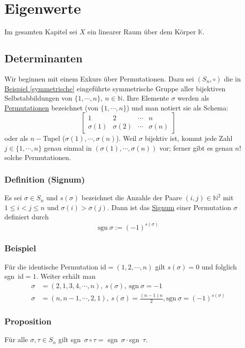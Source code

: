 \section{Eigenwerte}
Im gesamten Kapitel sei $X$ ein linearer Raum über dem Körper $\mathbb{K}$.
\subsection{Determinanten}
Wir beginnen mit einem Exkurs über Permutationen.  Dazu sei $(S_n,\circ )$ die in \hyperref[symmetrische]{Beispiel \ref*{symmetrische}} eingeführte symmetrische Gruppe aller bijektiven Selbstabbildungen von $\{1,\cdots ,n\},\ n\in\mathbb{N}$.  Ihre Elemente $\sigma$ werden als \underline{Permutationen} bezeichnet (von $\{1,\cdots ,n\}$) und man notiert sie als Schema:
\[\begin{bmatrix}1 & 2 & \cdots & n\\ \sigma (1) & \sigma (2) & \cdots & \sigma (n)\end{bmatrix}\]
oder als $n-$Tupel ($\sigma (1),\cdots ,\sigma (n)$).  Weil $\sigma$ bijektiv ist, kommt jede Zahl $j\in\{1,\cdots ,n\}$ genau einmal in $(\sigma (1),\cdots ,\sigma (n))$ vor; ferner gibt es genau $n!$ solche Permutationen.
\subsubsection{Definition (Signum)}
Es sei $\sigma \in S_n$ und $s(\sigma )$ bezeichnet die Anzahle der Paare $(i,j)\in\mathbb{N}^2$ mit $1\leq i<j\leq n$ und $\sigma (i) > \sigma (j)$.  Dann ist das \underline{Signum} einer Permutation $\sigma$ definiert durch
\[\mathrm{sgn~}\sigma := (-1)^{s(\sigma )}\]
\subsubsection{Beispiel}
\label{4.1.2}
Für die identische Permutation id$=(1,2,\cdots ,n)$ gilt $s(\sigma )=0$ und folglich sgn~id$=1$.  Weiter erhält man
\begin{align*}
\sigma &=(2,1,3,4,\cdots ,n),\ s(\sigma ),\ \mathrm{sgn~}\sigma =-1\\
\sigma &=(n,n-1,\cdots ,2, 1),\ s(\sigma )=\frac{(n-1)n}{2},\mathrm{sgn~}\sigma =(-1)^{s(\sigma )}
\end{align*}
\subsubsection{Proposition}
Für alle $\sigma ,\tau \in S_n$ gilt sgn~$\sigma \circ \tau =$ sgn~$\sigma\cdot$sgn~$\tau$.
